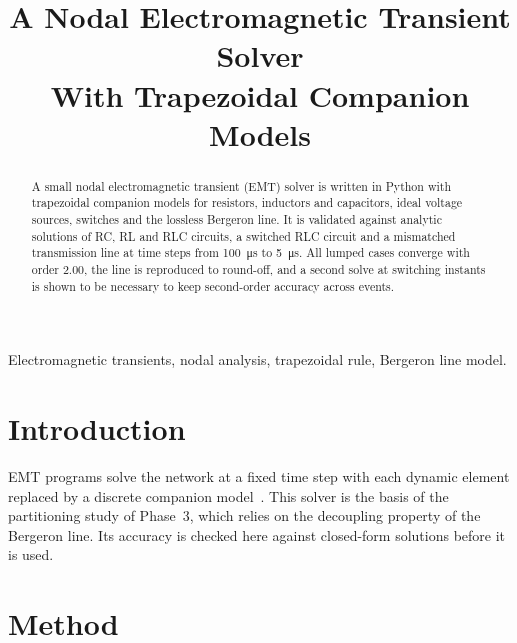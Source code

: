 \documentclass[conference]{IEEEtran}
\begin{document}
\title{A Nodal Electromagnetic Transient Solver\\With Trapezoidal Companion Models}
\author{
}
\maketitle

\begin{abstract}
A small nodal electromagnetic transient (EMT) solver is written in Python with trapezoidal companion models for resistors, inductors and capacitors, ideal voltage sources, switches and the lossless Bergeron line. It is validated against analytic solutions of RC, RL and RLC circuits, a switched RLC circuit and a mismatched transmission line at time steps from \SI{100}{\micro\second} to \SI{5}{\micro\second}. All lumped cases converge with order 2.00, the line is reproduced to round-off, and a second solve at switching instants is shown to be necessary to keep second-order accuracy across events.
\end{abstract}
\begin{IEEEkeywords}
Electromagnetic transients, nodal analysis, trapezoidal rule, Bergeron line model.
\end{IEEEkeywords}

\section{Introduction}
EMT programs solve the network at a fixed time step with each dynamic element replaced by a discrete companion model~\cite{dommel,watson}. This solver is the basis of the partitioning study of Phase~3, which relies on the decoupling property of the Bergeron line. Its accuracy is checked here against closed-form solutions before it is used.

\section{Method}
\end{document}
